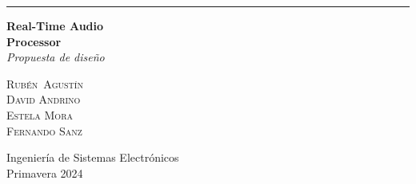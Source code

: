 
\begin{titlepage}
    \raggedleft
    \rule{1pt}{\textheight}
    \hspace{0.05\textwidth}
    \parbox[b]{0.9\textwidth}{
            {\Huge\bfseries Real-Time Audio \\[5px] Processor}\\[\baselineskip] %
            {\Large\textit{Propuesta de diseño}}\\[7\baselineskip] %
        \vspace{0.45\textheight}
        
        {\Large\textsc{Rubén\ Agustín}}\\[0.5\baselineskip]
        {\Large\textsc{David Andrino}}\\[0.5\baselineskip]
        {\Large\textsc{Estela Mora}}\\[0.5\baselineskip]
        {\Large\textsc{Fernando Sanz}}\\
        \vspace{0.05\textheight}
        
        {\noindent\large Ingeniería de Sistemas Electrónicos}\\
        {\noindent\large Primavera 2024}\\
    }

\end{titlepage}